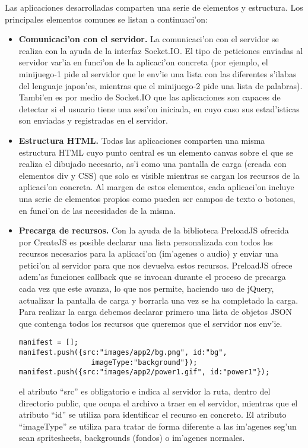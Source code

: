 Las aplicaciones desarrolladas comparten una serie de elementos y estructura. Los principales 
elementos comunes se listan a continuaci'on:

\begin{itemize}
\item \textbf{Comunicaci'on con el servidor.} La comunicaci'on con el servidor se realiza con la ayuda de la interfaz 
Socket.IO. El tipo de peticiones enviadas al servidor var'ia en funci'on de la aplicaci'on concreta (por ejemplo, el
minijuego-1 pide al servidor que le env'ie una lista con las diferentes s'ilabas del lenguaje japon'es, mientras que
el minijuego-2 pide una lista de palabras).
Tambi'en es por medio de Socket.IO que las aplicaciones son capaces de detectar si el usuario tiene una sesi'on 
iniciada, en cuyo caso sus estad'isticas son enviadas y registradas en el servidor.
\item \textbf{Estructura HTML.} Todas las aplicaciones comparten una misma estructura HTML cuyo punto central es un elemento
canvas sobre el que se realiza el dibujado necesario, as'i como una pantalla de carga (creada con elementos div y 
CSS) que solo es visible mientras se cargan los recursos de la aplicaci'on concreta.
Al margen de estos elementos, cada aplicaci'on incluye una serie de elementos propios como pueden ser campos de texto
o botones, en funci'on de las necesidades de la misma.
\item \textbf{Precarga de recursos.} Con la ayuda de la biblioteca PreloadJS ofrecida por CreateJS es posible declarar una
lista personalizada con todos los recursos necesarios para la aplicaci'on (im'agenes o audio) y enviar una petici'on
al servidor para que nos devuelva estos recursos.
PreloadJS ofrece adem'as funciones callback que se invocan durante el proceso de precarga cada vez que este avanza,
lo que nos permite, haciendo uso de jQuery, actualizar la pantalla de carga y borrarla una vez se ha completado la
carga.
Para realizar la carga debemos declarar primero una lista de objetos JSON que contenga todos los recursos que 
queremos que el servidor nos env'ie.

\begin{verbatim}
manifest = [];
manifest.push({src:"images/app2/bg.png", id:"bg", 
                 imageType:"background"});
manifest.push({src:"images/app2/power1.gif", id:"power1"});
\end{verbatim}

el atributo ``src'' es obligatorio e indica al servidor la ruta, dentro del directorio public, que ocupa el archivo
a traer en el servidor, mientras que el atributo ``id'' se utiliza para identificar el recurso en concreto. El atributo
``imageType'' se utiliza para tratar de forma diferente a las im'agenes seg'un sean spritesheets, backgrounds (fondos)
o im'agenes normales.


\end{itemize}
